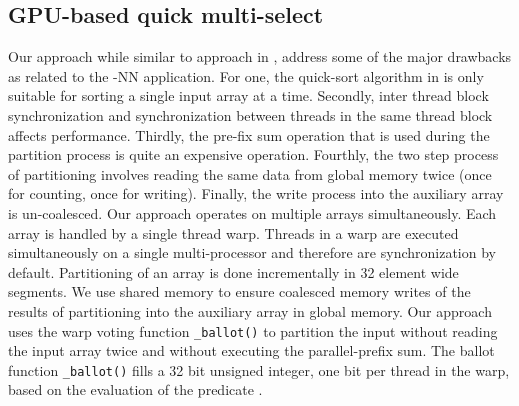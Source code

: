 \documentclass[10pt]{article}
\begin{document}
\subsection*{GPU-based quick multi-select}
Our approach while similar to approach in \cite{Cederman:2010}, address some of the major drawbacks as related to the -NN application. For one, the quick-sort algorithm in \cite{Cederman:2010} is only suitable for sorting a single input array at a time. Secondly, inter thread block synchronization and synchronization between threads in the same thread block affects performance. Thirdly, the pre-fix sum operation that is used during the partition process is quite an expensive operation. Fourthly, the two step process of partitioning involves reading the same data from global memory twice (once for counting, once for writing). Finally, the write process into the auxiliary array is un-coalesced. Our approach operates on multiple arrays simultaneously. Each array is handled by a single thread warp. Threads in a warp are executed simultaneously on a single multi-processor and therefore are synchronization by default.  Partitioning of an array is done incrementally in 32 element wide segments. We use shared memory to ensure coalesced memory writes of the results of partitioning into the auxiliary array in global memory.  Our approach uses the warp voting function \texttt{\_ballot()} to partition the input without reading the input array twice and without executing the parallel-prefix sum. The ballot function \texttt{\_ballot()} fills a 32 bit unsigned integer, one bit per thread in the warp, based on the evaluation of the predicate .\\
 
\end{document}
